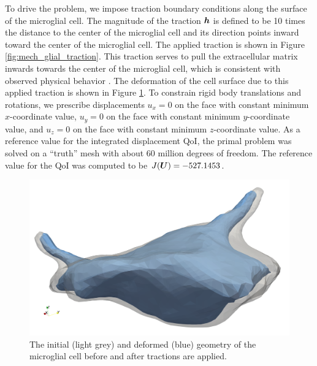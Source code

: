 To drive the problem, we impose traction boundary conditions along the
surface of the microglial cell. The magnitude of the traction $\boldsymbol{h}$ is
defined to be 10 times the distance to the center of the microglial cell and
its direction points inward toward the center of the microglial cell. The
applied traction is shown in Figure \ref{fig:mech_glial_traction}. This
traction serves to pull the extracellular matrix inwards towards the center
of the microglial cell, which is consistent with observed physical behavior
\cite{dong2017recovery}. The deformation of the cell surface due to this
applied traction is shown in Figure \ref{fig:mech_glial_deformed}. To
constrain rigid body translations and rotations, we prescribe displacements
$u_x = 0$ on the face with constant minimum $x$-coordinate value, $u_y = 0$
on the face with constant minimum $y$-coordinate value, and $u_z = 0$ on the
face with constant minimum $z$-coordinate value. As a reference value for
the integrated displacement QoI, the primal problem was solved on a ``truth''
mesh with about $60$ million degrees of freedom. The reference value for the
QoI was computed to be $J(\boldsymbol{U}) = -527.1453$.

\begin{figure}[ht!]
\centering
\includegraphics[width=.6\linewidth]{img/mech_glial_deformed.png}
\caption{The initial (light grey) and deformed (blue) geometry of the
microglial cell before and after tractions are applied.}
\label{fig:mech_glial_deformed}
\end{figure}


